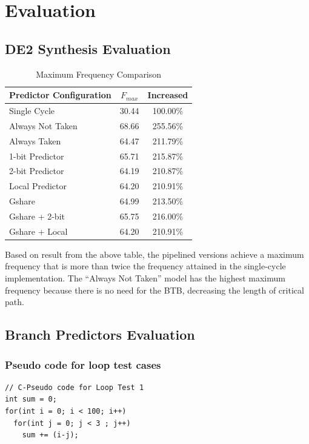 \documentclass[12pt,a4paper,oneside]{book} %
\begin{document}
\chapter{Evaluation}
\section{DE2 Synthesis Evaluation}
\begin{table}[H]
\caption{Maximum Frequency Comparison}
\centering
\begin{tabular}{|l|l|c|}
\hline
\multicolumn{1}{|c|}{\textbf{Predictor Configuration}} & \multicolumn{1}{c|}{$F_{max}$} & \multicolumn{1}{c|}{\textbf{Increased}} \\ \hline
\cellcolor[HTML]{EFEFEF}Single Cycle & \cellcolor[HTML]{EFEFEF}30.44 & \cellcolor[HTML]{EFEFEF}100.00\% \\ \hline
Always Not Taken & 68.66 & 255.56\% \\ \hline
Always Taken & 64.47 & 211.79\% \\ \hline
1-bit Predictor & 65.71 & 215.87\% \\ \hline
2-bit Predictor & 64.19 & 210.87\% \\ \hline
Local Predictor & 64.20 & 210.91\% \\ \hline
Gshare & 64.99 & 213.50\% \\ \hline
Gshare + 2-bit & 65.75 & 216.00\% \\ \hline
Gshare + Local & 64.20 & 210.91\% \\ \hline
\end{tabular}
\end{table}

Based on result from the above table, the pipelined versions achieve a maximum frequency that is more than twice the frequency attained in the single-cycle implementation. The ``Always Not Taken'' model has the highest maximum frequency because there is no need for the BTB, decreasing the length of critical path.

\section{Branch Predictors Evaluation}
\subsection{Pseudo code for loop test cases}
\begin{verbatim}
// C-Pseudo code for Loop Test 1
int sum = 0;
for(int i = 0; i < 100; i++)
  for(int j = 0; j < 3 ; j++)
    sum += (i-j);
\end{verbatim}
\end{document}
